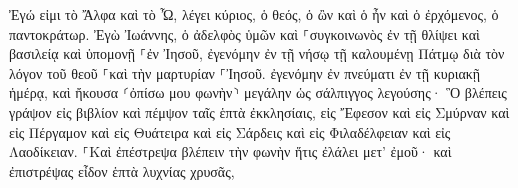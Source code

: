 \documentclass{openreader}
\begin{document}
Ἐγώ εἰμι τὸ Ἄλφα καὶ τὸ Ὦ, λέγει κύριος, ὁ θεός, ὁ ὢν καὶ ὁ ἦν καὶ ὁ ἐρχόμενος, ὁ παντοκράτωρ. 
Ἐγὼ Ἰωάννης, ὁ ἀδελφὸς ὑμῶν καὶ ⸀συγκοινωνὸς ἐν τῇ θλίψει καὶ βασιλείᾳ καὶ ὑπομονῇ ⸀ἐν Ἰησοῦ, ἐγενόμην ἐν τῇ νήσῳ τῇ καλουμένῃ Πάτμῳ διὰ τὸν λόγον τοῦ θεοῦ ⸀καὶ τὴν μαρτυρίαν ⸀Ἰησοῦ. 
ἐγενόμην ἐν πνεύματι ἐν τῇ κυριακῇ ἡμέρᾳ, καὶ ἤκουσα ⸂ὀπίσω μου φωνὴν⸃ μεγάλην ὡς σάλπιγγος 
λεγούσης· Ὃ βλέπεις γράψον εἰς βιβλίον καὶ πέμψον ταῖς ἑπτὰ ἐκκλησίαις, εἰς Ἔφεσον καὶ εἰς Σμύρναν καὶ εἰς Πέργαμον καὶ εἰς Θυάτειρα καὶ εἰς Σάρδεις καὶ εἰς Φιλαδέλφειαν καὶ εἰς Λαοδίκειαν. 
⸀Καὶ ἐπέστρεψα βλέπειν τὴν φωνὴν ἥτις ἐλάλει μετ’ ἐμοῦ· καὶ ἐπιστρέψας εἶδον ἑπτὰ λυχνίας χρυσᾶς, 
\end{document}
